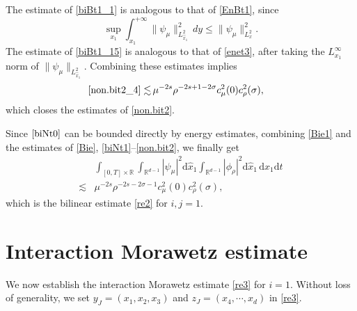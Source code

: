 \documentclass[11pt,letterpaper,reqno]{amsart}
\numberwithin{equation}{section}
\theoremstyle{definition}
\theoremstyle{remark}
\begin{document}
The estimate of \eqref{biBt1_1} is analogous to that of \eqref{EnBt1},
since
\[
    \sup_{x_1}
    \int_{x_1}^{+\infty}
        \|\psi_\mu\|_{L^2_{\widehat x_1}}^2\,dy
    \le
    \|\psi_\mu\|_{L^2_x}^2.
\]
The estimate of \eqref{biBt1_15} is analogous to that of \eqref{enet3},
after taking the \(L^\infty_{x_1}\) norm of
\(\|\psi_\mu\|_{L^2_{\widehat x_1}}\).  
Combining these  estimates   implies
\begin{align*}
	\eqref{non.bit2_4}\lesssim&\,   \mu ^{-2s} \rho^{-2s+1-2\sigma } c_\mu ^2(0) c_\rho^2(\sigma),
\end{align*}
which closes the estimates of \eqref{non.bit2}.

 
Since  \( \eqref{biNt0} \) can be bounded directly by energy estimates, 
 combining \eqref{Bie1} and the estimates of \eqref{Bie}, \eqref{biNt1}--\eqref{non.bit2}, we finally get
\begin{align*}
	&\int_{[0,T]\times \mathbb{R}} \int_{\mathbb{R}^{d-1}}    |\psi_\mu |^2  	\mathrm{d} \widehat{x}_1 \int_{\mathbb{R}^{d-1}} | \phi_\rho |^2 \mathrm{d} \widehat{x}_1 \,\mathrm{ d} x_1 \mathrm{ d} t \\
	\lesssim &\mu ^{-2s} \rho^{-2s-2\sigma -1} c_\mu ^2(0) c_\rho^2(\sigma),
\end{align*}
which is the bilinear estimate \eqref{re2} for $ i,j=1. $



\section{Interaction Morawetz estimate}  \label{secInter_ac}
We now establish the interaction Morawetz estimate \eqref{re3} for 
$i =1$. Without loss of generality, we set $y_J = (x_1,x_2,x_3)$ and $z_J = ( x_4,\cdots, x_d)$ in \eqref{re3}. 
 
\end{document}

